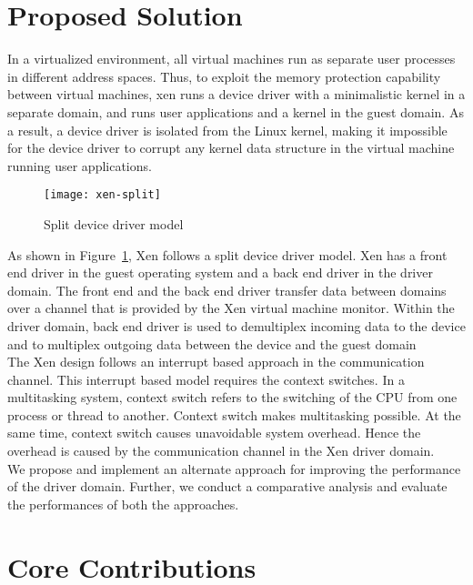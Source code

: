\pagebreak
  
\section {Proposed Solution} 

In a virtualized environment, all virtual machines run as separate user processes in different address spaces. Thus, to exploit the memory protection capability between virtual machines, xen runs a device driver with a minimalistic kernel in a separate domain, and runs user applications and a kernel in the guest domain. As a result, a device driver is isolated from the Linux kernel, making it impossible for the device driver to corrupt any kernel data structure in the virtual machine running user applications. 

\begin{figure}[!ht]
\centering
\texttt{[image: xen-split]}
\caption{Split device driver model}
\label{xen-split}
\end{figure}

As shown in Figure~\ref{xen-split}, Xen follows a split device driver model. Xen has a front end driver in the guest operating system and a back end driver in the driver domain. The front end and the back end driver transfer data between domains over a channel that is provided by the Xen virtual machine monitor. Within the driver domain, back end driver is used to demultiplex incoming data to the device and to multiplex outgoing data between the device and the guest domain\cite{driverdomain}
\\
The Xen design follows an interrupt based approach in the communication channel\cite{Barham:2003:XAV:945445.945462}. This interrupt based model requires the context switches\cite{Barham:2003:XAV:945445.945462}. In a multitasking system, context switch refers to the switching of the CPU from one process or thread to another. Context switch makes multitasking possible. At the same time, context switch causes unavoidable system overhead\cite{Li:2007:QCC:1281700.1281702, Mogul:1991:ECS:106973.106982}. Hence the overhead is caused by the communication channel in the Xen driver domain. 
\\
We propose and implement an alternate approach for improving the performance of the driver domain. Further, we conduct a comparative analysis and evaluate the performances of both the approaches. 

\pagebreak

\section{Core Contributions}

